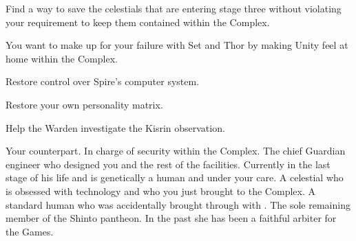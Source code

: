 \documentclass[char]{guardians}
\begin{document}
\begin{itemz}
  \item Find a way to save the celestials that are entering stage three without violating your requirement to keep them contained within the Complex.
  \item You want to make up for your failure with Set and Thor by making Unity feel at home within the Complex.
  \item Restore control over Spire's computer system.
  \item Restore your own personality matrix.
  \item Help the Warden investigate the Kisrin observation.
\end{itemz}


\begin{contacts}
  \contact{\cWarden{}} Your counterpart. In charge of security within the Complex.
  \contact{\cJascha{}} The chief Guardian engineer who designed you and the rest of the facilities. Currently in the last stage of his life and is genetically a human and under your care.
  \contact{\cUnity{}} A celestial who is obsessed with technology and who you just brought to the Complex.
  \contact{\cKachiko{}} A standard human who was accidentally brought through with \cUnity{}.
  \contact{\cAmaterasu{}} The sole remaining member of the Shinto pantheon. In the past she has been a faithful arbiter for the Games.
\end{contacts}
\end{document}

